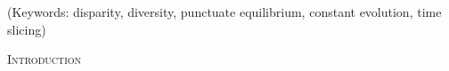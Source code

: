\documentclass[12pt,letterpaper]{article}
\renewcommand{\section}[1]{%
\bigskip
\begin{center}
\begin{Large}
\normalfont\scshape #1
\medskip
\end{Large}
\end{center}}
\begin{document}
\begin{abstract}



\end{abstract}

\noindent (Keywords: disparity, diversity, punctuate equilibrium, constant evolution, time slicing)\\

\vspace{1.5in}

\newpage 

%
%

\section{Introduction}
\end{document}
